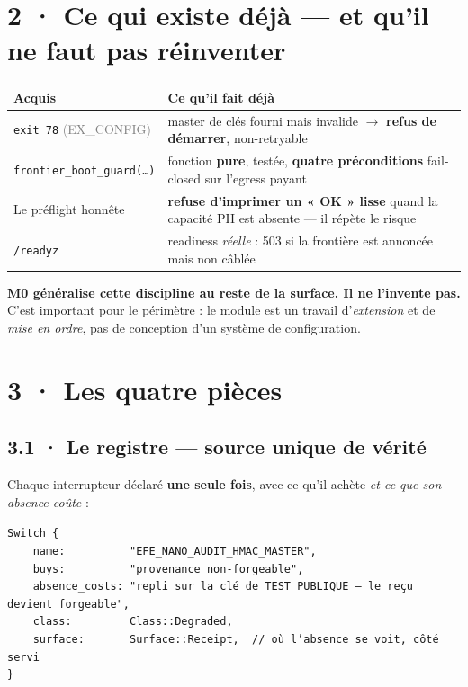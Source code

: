 \documentclass[10pt]{article}
\newcommand{\sz}[1]{\textcolor{grey}{\small\textsf{#1}}}
\newcommand{\code}[1]{\texttt{\small #1}}
\newcommand{\fl}{$\rightarrow$}
\begin{document}
\section{2 · Ce qui existe déjà --- et qu'il ne faut pas réinventer}

\renewcommand{\arraystretch}{1.22}
\begin{center}\small
\begin{tabular}{@{}>{\raggedright\arraybackslash}p{5.4cm} >{\raggedright\arraybackslash}p{10.4cm}@{}}
\toprule
\textbf{Acquis} & \textbf{Ce qu'il fait déjà} \\
\midrule
\code{exit 78} \sz{(EX\_CONFIG)} & master de clés fourni mais invalide \fl{} \textbf{refus de démarrer}, non-retryable \\
\code{frontier\_boot\_guard(…)} & fonction \textbf{pure}, testée, \textbf{quatre préconditions} fail-closed sur l'egress payant \\
Le préflight honnête & \textbf{refuse d'imprimer un « OK » lisse} quand la capacité PII est absente --- il répète le risque \\
\code{/readyz} & readiness \emph{réelle} : 503 si la frontière est annoncée mais non câblée \\
\bottomrule
\end{tabular}
\end{center}

\begin{acquis}
\textbf{M0 généralise cette discipline au reste de la surface. Il ne l'invente pas.} C'est important
pour le périmètre : le module est un travail d'\emph{extension} et de \emph{mise en ordre}, pas de
conception d'un système de configuration.
\end{acquis}

\section{3 · Les quatre pièces}

\subsection{3.1 · Le registre --- source unique de vérité}

Chaque interrupteur déclaré \textbf{une seule fois}, avec ce qu'il achète \emph{et ce que son absence
coûte} :

\begin{extrait}
\code{Switch \{} \\
\code{\ \ \ \ name:\ \ \ \ \ \ \ \ \ \ "EFE\_NANO\_AUDIT\_HMAC\_MASTER",} \\
\code{\ \ \ \ buys:\ \ \ \ \ \ \ \ \ \ "provenance non-forgeable",} \\
\code{\ \ \ \ absence\_costs:\ "repli sur la clé de TEST PUBLIQUE --- le reçu devient forgeable",} \\
\code{\ \ \ \ class:\ \ \ \ \ \ \ \ \ Class::Degraded,} \\
\code{\ \ \ \ surface:\ \ \ \ \ \ \ Surface::Receipt,\ \ // où l'absence se voit, côté servi} \\
\code{\}}
\end{extrait}
\end{document}
